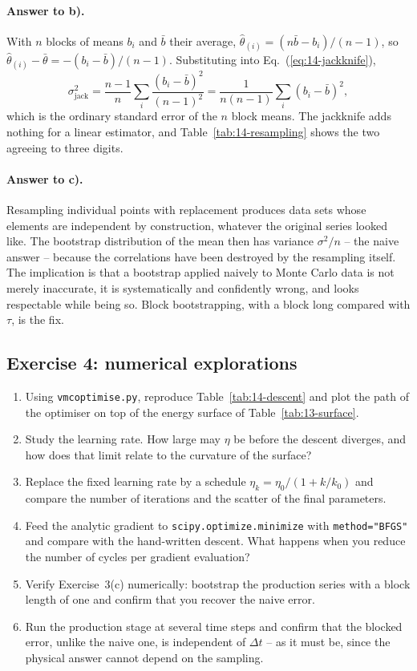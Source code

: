 \paragraph{Answer to b).}
With $n$ blocks of means $b_i$ and $\bar b$ their average,
$\hat\theta_{(i)} = (n\bar b - b_i)/(n-1)$, so
$\hat\theta_{(i)}-\bar\theta = -(b_i-\bar b)/(n-1)$.  Substituting into
Eq.~(\ref{eq:14-jackknife}),
\[
  \sigma^2_{\mathrm{jack}}
   = \frac{n-1}{n}\sum_i\frac{(b_i-\bar b)^2}{(n-1)^2}
   = \frac{1}{n(n-1)}\sum_i (b_i-\bar b)^2 ,
\]
which is the ordinary standard error of the $n$ block means.  The jackknife
adds nothing for a linear estimator, and Table~\ref{tab:14-resampling} shows
the two agreeing to three digits.

\paragraph{Answer to c).}
Resampling individual points with replacement produces data sets whose
elements are independent by construction, whatever the original series looked
like.  The bootstrap distribution of the mean then has variance
$\sigma^2/n$ -- the naive answer -- because the correlations have been
destroyed by the resampling itself.  The implication is that a bootstrap
applied naively to Monte Carlo data is not merely inaccurate, it is
systematically and confidently wrong, and looks respectable while being so.
Block bootstrapping, with a block long compared with $\tau$, is the fix.

\subsection*{Exercise 4: numerical explorations}

\begin{enumerate}
  \item[a)] Using \texttt{vmcoptimise.py}, reproduce
  Table~\ref{tab:14-descent} and plot the path of the optimiser on top of the
  energy surface of Table~\ref{tab:13-surface}.
  \item[b)] Study the learning rate.  How large may $\eta$ be before the
  descent diverges, and how does that limit relate to the curvature of the
  surface?
  \item[c)] Replace the fixed learning rate by a schedule
  $\eta_k = \eta_0/(1+k/k_0)$ and compare the number of iterations and the
  scatter of the final parameters.
  \item[d)] Feed the analytic gradient to \texttt{scipy.optimize.minimize}
  with \texttt{method="BFGS"} and compare with the hand-written descent.  What
  happens when you reduce the number of cycles per gradient evaluation?
  \item[e)] Verify Exercise~3(c) numerically: bootstrap the production series
  with a block length of one and confirm that you recover the naive error.
  \item[f)] Run the production stage at several time steps and confirm that
  the blocked error, unlike the naive one, is independent of $\Delta t$ -- as
  it must be, since the physical answer cannot depend on the sampling.
\end{enumerate}
